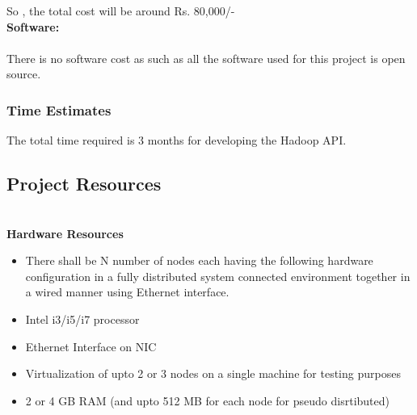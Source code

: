 \documentclass[oneside,a4paper,12pt]{report}
\begin{document}
So , the total cost will be around Rs. 80,000/- \\

\noindent \textbf{Software:} \\ \\
There is no software cost as such as all the software used for this project is open
source.


\subsubsection{Time Estimates}
The total time required is 3 months for developing the Hadoop API.


\subsection{Project Resources}
\textbf{ \\ Hardware Resources}
\begin{itemize}
\item There shall be N number of nodes each having the following hardware configuration in a fully distributed system connected environment together in a wired manner using Ethernet interface.
\item Intel i3/i5/i7 processor
\item Ethernet Interface on NIC
\item Virtualization of upto 2 or 3 nodes on a single machine for testing purposes
\item 2 or 4 GB RAM (and upto 512 MB for each node for pseudo disrtibuted) \\
\end{itemize}
\end{document}
